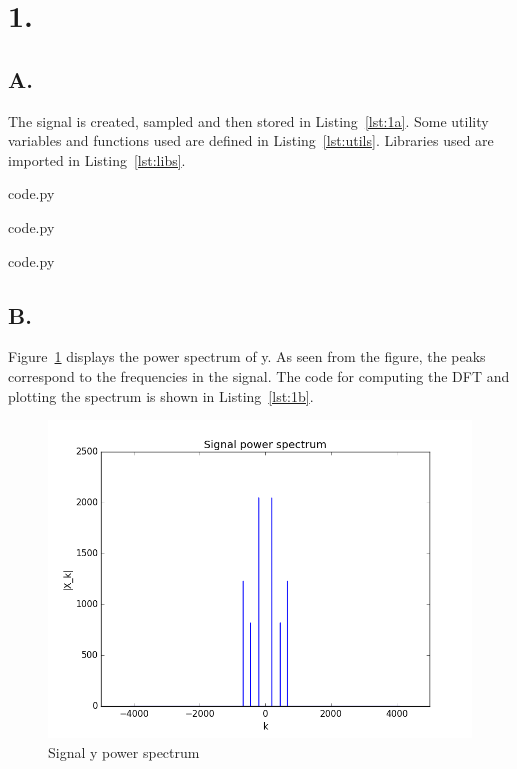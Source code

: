 \section*{1.}

\subsection*{A.}

The signal is created, sampled and then stored in Listing~\ref{lst:1a}.
Some utility variables and functions used are defined in Listing~\ref{lst:utils}.
Libraries used are imported in Listing~\ref{lst:libs}.


  {code.py}


  {code.py}


  {code.py}

\subsection*{B.}

Figure~\ref{fig:1b} displays the power spectrum of y.
As seen from the figure, the peaks correspond to the frequencies in the signal.
The code for computing the DFT and plotting the spectrum is shown in Listing~\ref{lst:1b}.

\begin{figure}[H]
  \includegraphics[width=\textwidth]{1b}
  \caption{Signal y power spectrum}
  \label{fig:1b}
\end{figure}


